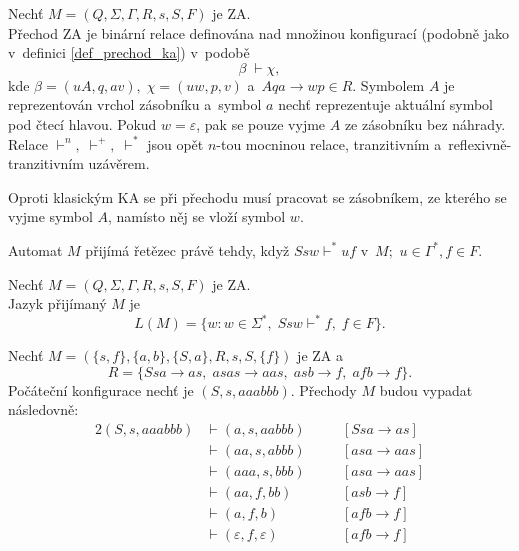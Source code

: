 \begin{definition}\label{def_prechod_za}
    Nechť $M = (Q, \Sigma, \Gamma, R, s, S, F)$ je ZA.\\
    Přechod ZA je binární relace definována nad množinou konfigurací (podobně jako v~definici \ref{def_prechod_ka}) v~podobě
    \begin{equation*}
        \beta\; \vdash \chi,
    \end{equation*}
    kde $\beta = (uA, q, av),\; \chi = (uw, p, v)$ a~$Aqa \rightarrow wp \in R$.
    Symbolem $A$ je reprezentován vrchol zásobníku a~symbol $a$ nechť reprezentuje aktuální symbol pod čtecí hlavou.
    Pokud $w = \varepsilon$, pak se pouze vyjme $A$ ze zásobníku bez náhrady.
    Relace $\vdash^n,\; \vdash^+,\; \vdash^*$ jsou opět $n$-tou mocninou relace, tranzitivním a~reflexivně-tran\-zi\-tiv\-ním uzávěrem.
\end{definition}
Oproti klasickým KA se při přechodu musí pracovat se zásobníkem, ze kterého se vyjme symbol $A$, namísto něj se vloží symbol $w$.

Automat $M$ přijímá řetězec právě tehdy, když $Ssw \vdash^* uf$ v~$M;$ $u \in \Gamma^*, f \in F$.
\begin{definition}\label{def_jazyk_za}
    Nechť $M = (Q, \Sigma, \Gamma, R, s, S, F)$ je ZA.\\
    Jazyk přijímaný $M$ je
    \begin{equation*}
        L(M) = \{w : w \in \Sigma^*,\; Ssw \vdash^* f,\; f \in F\}.
    \end{equation*}
\end{definition}

\begin{example}\label{example_za}
    Nechť $M = (\{s, f\}, \{a, b\}, \{S, a\}, R, s, S, \{f\})$ je ZA a 
    \begin{equation*}
        R = \{Ssa \rightarrow as,\; asas \rightarrow aas,\; asb \rightarrow f,\; afb \rightarrow f\}.
    \end{equation*}
    Počáteční konfigurace nechť je $(S, s, aaabbb)$.
    Přechody $M$ budou vypadat následovně:
    \begin{alignat*}{2}
        (S, s, aaabbb) &\vdash (a, s, aabbb) \quad && [Ssa \rightarrow as] \\
                       &\vdash (aa, s, abbb) \quad && [asa \rightarrow aas] \\
                       &\vdash (aaa, s, bbb) \quad && [asa \rightarrow aas] \\
                       &\vdash (aa, f, bb) \quad   && [asb \rightarrow f] \\ 
                       &\vdash (a, f, b) \quad      && [afb \rightarrow f] \\
                       &\vdash (\varepsilon, f, \varepsilon) \quad && [afb \rightarrow f]
    \end{alignat*}
\end{example}

